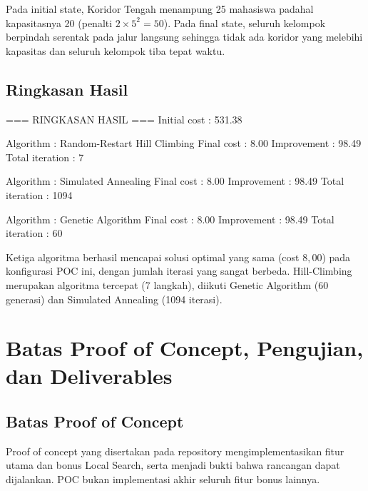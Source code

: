\documentclass[11pt,a4paper]{article}
\begin{document}
Pada initial state, Koridor Tengah menampung 25 mahasiswa padahal kapasitasnya 20 (penalti $2 \times 5^2 = 50$). Pada final state, seluruh kelompok berpindah serentak pada jalur langsung sehingga tidak ada koridor yang melebihi kapasitas dan seluruh kelompok tiba tepat waktu.

\subsection{Ringkasan Hasil}

\begin{outcode}
=== RINGKASAN HASIL ===
Initial cost    : 531.38

Algorithm       : Random-Restart Hill Climbing
Final cost      : 8.00
Improvement     : 98.49%
Total iteration : 7

Algorithm       : Simulated Annealing
Final cost      : 8.00
Improvement     : 98.49%
Total iteration : 1094

Algorithm       : Genetic Algorithm
Final cost      : 8.00
Improvement     : 98.49%
Total iteration : 60
\end{outcode}

Ketiga algoritma berhasil mencapai solusi optimal yang sama (cost $8{,}00$) pada konfigurasi POC ini, dengan jumlah iterasi yang sangat berbeda. Hill-Climbing merupakan algoritma tercepat (7 langkah), diikuti Genetic Algorithm (60 generasi) dan Simulated Annealing (1094 iterasi).

\section{Batas Proof of Concept, Pengujian, dan Deliverables}

\subsection{Batas Proof of Concept}

Proof of concept yang disertakan pada repository mengimplementasikan fitur utama dan bonus Local Search, serta menjadi bukti bahwa rancangan dapat dijalankan. POC bukan implementasi akhir seluruh fitur bonus lainnya.
\end{document}
